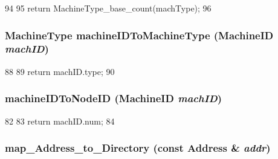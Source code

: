 \begin{DoxyCode}
94 {
95     return MachineType_base_count(machType);
96 }
\end{DoxyCode}
\hypertarget{RubySlicc__ComponentMapping_8hh_aa054eb921191818fb53a5d26e5a61338}{
\subsubsection[{machineIDToMachineType}]{\setlength{\rightskip}{0pt plus 5cm}MachineType machineIDToMachineType ({\bf MachineID} {\em machID})}}
\label{RubySlicc__ComponentMapping_8hh_aa054eb921191818fb53a5d26e5a61338}



\begin{DoxyCode}
88 {
89     return machID.type;
90 }
\end{DoxyCode}
\hypertarget{RubySlicc__ComponentMapping_8hh_ab3f39dc0ba9b41811c448c63a9dab171}{
\subsubsection[{machineIDToNodeID}]{ machineIDToNodeID ({\bf MachineID} {\em machID})}}
\label{RubySlicc__ComponentMapping_8hh_ab3f39dc0ba9b41811c448c63a9dab171}



\begin{DoxyCode}
82 {
83     return machID.num;
84 }
\end{DoxyCode}
\hypertarget{RubySlicc__ComponentMapping_8hh_aa36e0c9a077123ca73feb9afe15b1840}{
\subsubsection[{map\_\-Address\_\-to\_\-Directory}]{ map\_\-Address\_\-to\_\-Directory (const {\bf Address} \& {\em addr})}}
\label{RubySlicc__ComponentMapping_8hh_aa36e0c9a077123ca73feb9afe15b1840}



